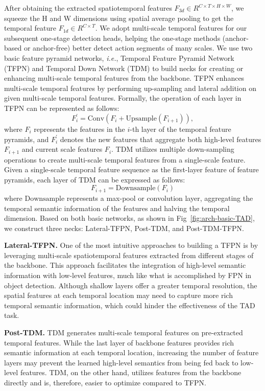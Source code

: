 \documentclass[a4paper,fleqn]{cas-dc}
\begin{document}
After obtaining the extracted spatiotemporal features $F_{3d} \in R^{C\times T \times H \times W}$, we squeeze the H and W dimensions using spatial average pooling to get the temporal feature $F_{1d} \in R^{C\times T}$. We adopt multi-scale temporal features for our subsequent one-stage detection heads, helping the one-stage methods (anchor-based or anchor-free) better detect action segments of many scales. We use two basic feature pyramid networks, \emph{i.e.}, Temporal Feature Pyramid Network (TFPN) and Temporal Down Network (TDM) to build necks for creating or enhancing multi-scale temporal features from the backbone. TFPN enhances multi-scale temporal features by performing up-sampling and lateral addition on given multi-scale temporal features. Formally, the operation of each layer in TFPN can be represented as follows:
\begin{equation}
    F_{i}^{'}= \text{Conv}(F_{i}+\text{Upsample}(F_{i+1})),
\end{equation}
where $F_i$ represents the features in the $i$-th layer of the temporal feature pyramids, and $F_{i}^{'}$ denotes the new features that aggregate both high-level features $F_{i+1}$ and current scale features $F_{i}$. TDM utilizes multiple down-sampling operations to create multi-scale temporal features from a single-scale feature. Given a single-scale temporal feature sequence as the first-layer feature of feature pyramids, each layer of TDM can be expressed as follows:
\begin{equation}
    F_{i+1}=\text{Downsample}(F_{i})
\end{equation}
where $\text{Downsample}$ represents a max-pool or convolution layer, aggregating the temporal semantic information of the features and halving the temporal dimension. Based on both basic networks, as shown in Fig~\ref{fig:arch-basic-TAD}, we construct three necks: Lateral-TFPN, Post-TDM, and Post-TDM-TFPN.

\textbf{Lateral-TFPN.}
One of the most intuitive approaches to building a TFPN is by leveraging multi-scale spatiotemporal features extracted from different stages of the backbone. This approach facilitates the integration of high-level semantic information with low-level features, much like what is accomplished by FPN in object detection.
Although shallow layers offer a greater temporal resolution, the spatial features at each temporal location may need to capture more rich temporal semantic information, which could hinder the effectiveness of the TAD task.


\textbf{Post-TDM.} 
TDM generates multi-scale temporal features on pre-extracted temporal features. While the last layer of backbone features provides rich semantic information at each temporal location, increasing the number of feature layers may prevent the learned high-level semantics from being fed back to low-level features. TDM, on the other hand, utilizes features from the backbone directly and is, therefore, easier to optimize compared to TFPN.
\end{document}
